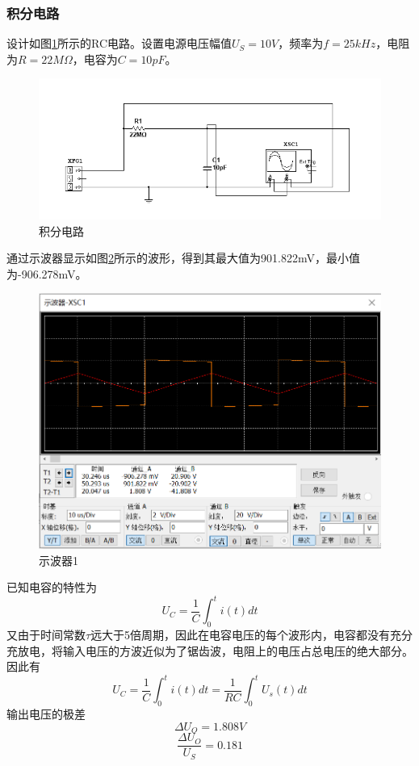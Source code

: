 \documentclass{ctexart}
\begin{document}
\subsubsection{积分电路}
设计如图\ref{fig:积分电路}所示的RC电路。设置电源电压幅值$U_S=10V$，频率为$f=25kHz$，电阻为$R=22M\Omega$，电容为$C=10pF$。
\begin{figure}[!ht]
    \centering
    \includegraphics{pic/积分电路.png}
    \caption{积分电路}
    \label{fig:积分电路}
\end{figure}
通过示波器显示如图\ref{fig:示波器1}所示的波形，得到其最大值为901.822mV，最小值为-906.278mV。
\begin{figure}
    \centering
    \includegraphics{pic/示波器1.png}
    \caption{示波器1}
    \label{fig:示波器1}
\end{figure}
已知电容的特性为
\begin{equation}
    U_C=\dfrac{1}{C}\int_0^t i(t)dt
\end{equation}
又由于时间常数$\tau$远大于5倍周期，因此在电容电压的每个波形内，电容都没有充分充放电，将输入电压的方波近似为了锯齿波，电阻上的电压占总电压的绝大部分。因此有
\begin{equation}
    U_C=\dfrac{1}{C}\int_0^t i(t)dt =\dfrac{1}{RC}\int _0^t U_s(t)dt
\end{equation}
输出电压的极差
\begin{equation}
    \Delta U_O = 1.808V 
\end{equation}
\begin{equation}
    \dfrac{\Delta U_O}{U_S}=0.181
\end{equation}
\end{document}
